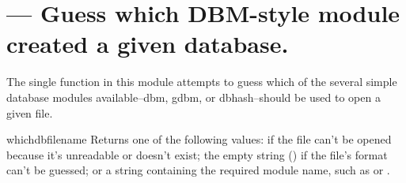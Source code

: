 \section{ ---
         Guess which DBM-style module created a given database.}



The single function in this module attempts to guess which of the
several simple database modules available--dbm, gdbm, or
dbhash--should be used to open a given file.

\begin{funcdesc}{whichdb}{filename}
Returns one of the following values:  if the file can't be
opened because it's unreadable or doesn't exist; the empty string
() if the file's format can't be guessed; or a string
containing the required module name, such as  or
.
\end{funcdesc}

